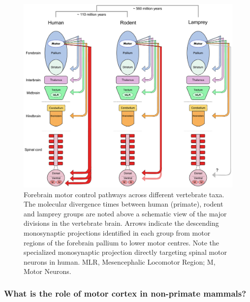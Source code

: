 \begin{figure}
\begin{center}
\includegraphics[width=\columnwidth]{chapters/figuresChTeleology/descendingTaxa}
\end{center}
\vspace{-5mm}
\caption{Forebrain motor control pathways across different vertebrate taxa. The molecular divergence times between human (primate), rodent and lamprey groups \protect\cite{Kumar1998} are noted above a schematic view of the major divisions in the vertebrate brain. Arrows indicate the descending monosynaptic projections identified in each group from motor regions of the forebrain pallium to lower motor centres. Note the specialized monosynaptic projection directly targeting spinal motor neurons in human. MLR, Mesencephalic Locomotor Region; M, Motor Neurons.}
\label{fig:descendingTaxa}
\end{figure}

\subsubsection*{What is the role of motor cortex in non-primate mammals?}

